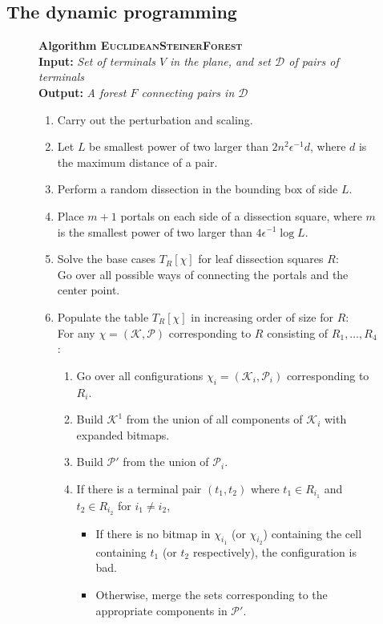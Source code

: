\documentclass[extras,11pt]{article} \usepackage{fullpage}
\makeatletter
\theoremstyle{mytheorem}
\newcommand{\eps}{\epsilon}
\newcommand{\DD}{\mathcal{D}}
\newcommand{\algo}[1]{\textsc{#1}}
\newcommand{\algtitle}[1]{\vspace{.1cm}\textbf{#1}}
\newcommand{\alginput}[1]{\\\textbf{Input:} \textit{#1}}
\newcommand{\algoutput}[1]{\\\textbf{Output:} \textit{#1}}
{\makeatletter
 \gdef\xxxmark{\expandafter\ifx\csname @mpargs\endcsname\relax \expandafter\ifx\csname @captype\endcsname\relax \marginpar{xxx}\else
       xxx \fi
   \else
     xxx \fi}
 \gdef\xxx{\@ifnextchar[\xxx@lab\xxx@nolab}
 \long\gdef\xxx@lab[#1]#2{{\bf [\xxxmark #2 ---{\sc #1}]}}
 \long\gdef\xxx@nolab#1{{\bf [\xxxmark #1]}}
}
\makeatother
\begin{document}
\subsection{The dynamic programming}


\begin{figure}
\begin{algorithm}
\algtitle{Algorithm \algo{EuclideanSteinerForest}}
\alginput{Set of terminals $V$ in the plane, and set $\DD$ of pairs of terminals}
\algoutput{A forest $F$ connecting pairs in $\DD$}
\begin{enumerate}\setlength{\itemsep}{-.00in}
\item Carry out the perturbation and scaling.
\item Let $L$ be smallest power of two larger than $2n^2\eps^{-1}d$, where $d$ is the maximum distance of a pair.
\item Perform a random dissection in the bounding box of side $L$.
\item Place $m+1$ portals on each side of a dissection square, where $m$ is the smallest power of two larger than  $4\eps^{-1}\log L$.
\item Solve the base cases $T_R[\chi]$ for leaf dissection squares $R$:\\
Go over all possible ways of connecting the portals and the center point.
\item Populate the table $T_R[\chi]$ in increasing order of size for $R$:\\
      For any $\chi=(\mathcal{K},\mathcal{P})$ corresponding to $R$ consisting of $R_1,\dots,R_4$:
\begin{enumerate}\setlength{\itemsep}{-.02in}
 \item Go over all configurations $\chi_i=(\mathcal{K}_i,\mathcal{P}_i)$ corresponding to $R_i$.
 \item Build $\mathcal{K}^1$ from the union of all components of $\mathcal{K}_i$ with expanded bitmaps.
 \item Build $\mathcal{P}'$ from the union of $\mathcal{P}_i$.
 \item If there is a terminal pair $(t_1,t_2)$ where $t_1\in R_{i_1}$ and $t_2\in R_{i_2}$ for $i_1\neq i_2$,
\begin{itemize}\setlength{\itemsep}{-.02in}
 \item If there is no bitmap in $\chi_{i_1}$ (or $\chi_{i_2}$) containing the cell containing $t_1$ (or $t_2$ respectively), the configuration is bad.
 \item Otherwise, merge the sets corresponding to the appropriate components in $\mathcal{P}'$.

\end{itemize}
\end{enumerate}
\end{enumerate}
\end{algorithm}
\end{figure}
\end{document}
